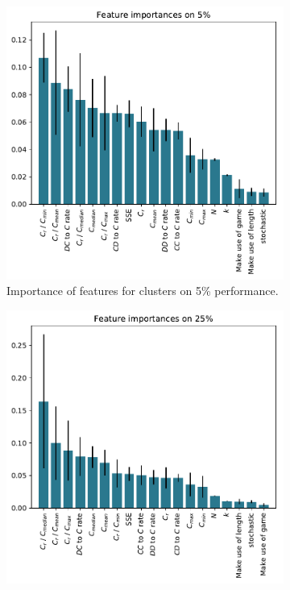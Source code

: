 \documentclass{article}
\begin{document}
\begin{figure}[!htbp]
    \begin{subfigure}[t]{0.5\textwidth}
        \begin{center}
            \includegraphics[width=.75\linewidth]{../new_output/merged/_feature_importance_bar_plot_cluster_on_0_05.pdf}
        \end{center}
        \caption{Importance of features for clusters on 5\% performance.}
    \end{subfigure}
    \begin{subfigure}[t]{0.5\textwidth}
        \begin{center}
            \includegraphics[width=.75\linewidth]{../new_output/merged/_feature_importance_bar_plot_cluster_on_0_25.pdf}

\end{center}
\end{subfigure}
\end{figure}
\end{document}
